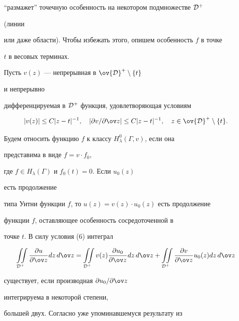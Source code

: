 ``размажет'' точечную особенность на некотором подмножестве $\cal D^+$


(линии


или даже области). Чтобы избежать этого, опишем особенность $f$ в точке


$t$ в весовых терминах.





Пусть $v(z)$ --- непрерывная в $\ov{\cal D}^+\setminus\{t\}$


и непрерывно


дифференцируемая в $\cal D^+$ функция, удовлетворяющая условиям


\begin{equation}


|v(z)|\le C|z-t|^{-1},\quad


|\partial v/\partial\ov z|\le C|z-t|^{-1}, \quad


z\in\ov{\cal D}^+\setminus\{t\}.


\end{equation}


Будем относить функцию $f$ к классу $H^0_\lambda(\Gamma,v)$, если она


представима в виде $f=v\cdot f_0$,


где $f\in H_\lambda(\Gamma)$ и $f_0(t)=0$. Если $u_0(z)$


есть продолжение


типа Уитни функции $f$, то $u(z)=v(z)\cdot u_0(z)$ есть продолжение


функции $f$, оставляющее особенность сосредоточенной в


точке $t$. В силу условия (6) интеграл


\begin{equation}


\iint\limits_{\cal D^+}\frac{\partial u}{\partial\ov z}dz\,d\ov z=


\iint\limits_{\cal D^+}v(z)\frac{\partial u_0}{\partial\ov z}


dz\,d\ov z+\iint\limits_{\cal D^+}\frac{\partial v}{\partial\ov z}


u_0(z)dz\,d\ov z


\end{equation}


существует, если производная $\partial u_0/\partial\ov z$


интегрируема в некоторой степени,


большей двух. Согласно уже упоминавшемуся результату из


